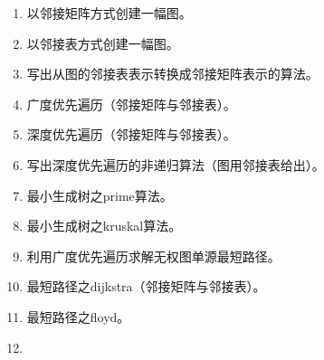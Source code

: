 \documentclass[lang=cn,newtx,10pt,scheme=chinese]{../../elegantbook}
\begin{document}
\begin{enumerate}
\def\labelenumi{\arabic{enumi}.}
\item
  
  以邻接矩阵方式创建一幅图。
  
\vspace{5cm}
\item
  
  以邻接表方式创建一幅图。
  
\vspace{5cm}
\item
  
  写出从图的邻接表表示转换成邻接矩阵表示的算法。
  
\vspace{5cm}
\item
  
  广度优先遍历（邻接矩阵与邻接表）。
  
\vspace{5cm}
\item
  
  深度优先遍历（邻接矩阵与邻接表）。
  
\vspace{5cm}
\item
  
  写出深度优先遍历的非递归算法（图用邻接表给出）。
  
\vspace{5cm}
\item
  
  最小生成树之prime算法。
  
\vspace{5cm}
\item
  
  最小生成树之kruskal算法。
  
\vspace{5cm}
\item
  
  利用广度优先遍历求解无权图单源最短路径。
  
\vspace{5cm}
\item
  
  最短路径之dijkstra（邻接矩阵与邻接表）。
  
\vspace{5cm}
\item
  
  最短路径之floyd。
  
\vspace{5cm}
\item
  

\end{enumerate}
\end{document}
